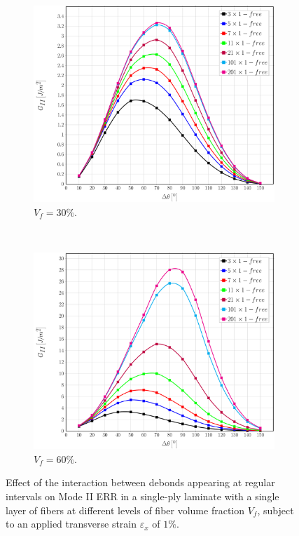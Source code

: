 \documentclass[review]{elsarticle}
\begin{document}
\begin{figure}[!h]
\centering
    \begin{subfigure}[b]{0.475\textwidth}
        \includegraphics[width=\textwidth]{sidefibers-vf30-GII.pdf}
        \caption{$V_{f}=30\%$.}\label{subfig:sidefiber30MII}
    \end{subfigure} ~
    \begin{subfigure}[b]{0.475\textwidth}
        \includegraphics[width=\textwidth]{sidefibers-vf60-GII.pdf}
        \caption{$V_{f}=60\%$.}\label{subfig:sidefiber60MII}
    \end{subfigure}

\caption{Effect of the interaction between debonds appearing at regular intervals on Mode II ERR in a single-ply laminate with a single layer of fibers at different levels of fiber volume fraction $V_{f}$, subject to an applied transverse strain $\varepsilon_{x}$ of $1\%$.}\label{fig:sidefibersMII}
\end{figure}
\end{document}
